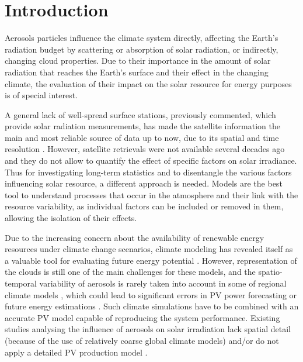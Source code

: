 


\section{Introduction}



Aerosols particles influence the climate system directly, affecting the Earth’s radiation budget by scattering or absorption of solar radiation, or indirectly, changing cloud properties. Due to their importance in the amount of solar radiation that reaches the Earth’s surface and their effect in the changing climate, the evaluation of their impact on the solar resource for energy purposes is of special interest.

A general lack of well-spread surface stations, previously commented, which provide solar radiation measurements, has made the satellite information the main and most reliable source of data up to now, due to its spatial and time resolution \cite*{Posselt2012, Ineichen2014}. However, satellite retrievals were not available several decades ago and they do not allow to quantify the effect of specific factors on solar irradiance. Thus for investigating long-term statistics and to disentangle the various factors influencing solar resource, a different approach is needed. Models are the best tool to understand processes that occur in the atmosphere and their link with the resource variability, as individual factors can be included or removed in them, allowing the isolation of their effects.

Due to the increasing concern about the availability of renewable energy resources under climate change scenarios, climate modeling has revealed itself as a valuable tool for evaluating future energy potential \cite*{Crook2011, Gaetani2014, Gaetani2015, Jerez2015, Jerez2015climix, Tobin2016}. However, representation of the clouds is still one of the main challenges for these models, and the spatio-temporal variability of aerosols is rarely taken into account in some of regional climate models \cite*{Bartok2017}, which could lead to significant errors in PV power forecasting or future energy estimations \cite*{Rieger2017}. Such climate simulations have to be combined with an accurate PV model capable of reproducing the system performance. Existing studies analysing the influence of aerosols on solar irradiation lack spatial detail (because of the use of relatively coarse global climate models) and/or do not apply a detailed PV production model \cite*{Bergin2017}. 


